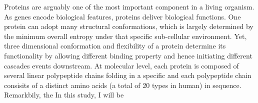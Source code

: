 Proteins are arguably one of the most important component in a living organism. As genes encode biological features, proteins deliver biological functions. One protein can adopt many structural conformations, which is largely determined by the minimum overall entropy under that specific sub-cellular environment. Yet, three dimensional conformation and flexibility of a protein determine its functionality by allowing different binding property and hence initiating different cascades events downstream. At molecular level, each protein is composed of several linear polypeptide chains folding in a specific and each polypeptide chain consisits of a distinct amino acids (a total of 20 types in human) in sequence. Remarkbily, the  In this study, I will be 